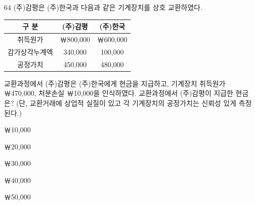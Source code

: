 \begin{question}{64}
(주)감평은 (주)한국과 다음과 같은 기계장치를 상호 교환하였다.
\par{\small\centering\begin{tabular}{|c|c|c|}\hline
구 분 & (주)감평 & (주)한국 \\ \hline
취득원가 & ￦800,000 & ￦600,000 \\ \hline
감가상각누계액 & 340,000 & 100,000 \\ \hline
공정가치 & 450,000 & 480,000 \\ \hline
\end{tabular}\par}
교환과정에서 (주)감평은 (주)한국에게 현금을 지급하고, 기계장치 취득원가 ￦470,000, 처분손실 ￦10,000을 인식하였다. 교환과정에서 (주)감평이 지급한 현금은? (단, 교환거래에 상업적 실질이 있고 각 기계장치의 공정가치는 신뢰성 있게 측정된다.)
\begin{choices}
  \item ￦10,000
  \item ￦20,000
  \item ￦30,000
  \item ￦40,000
  \item ￦50,000
\end{choices}
\end{question}
